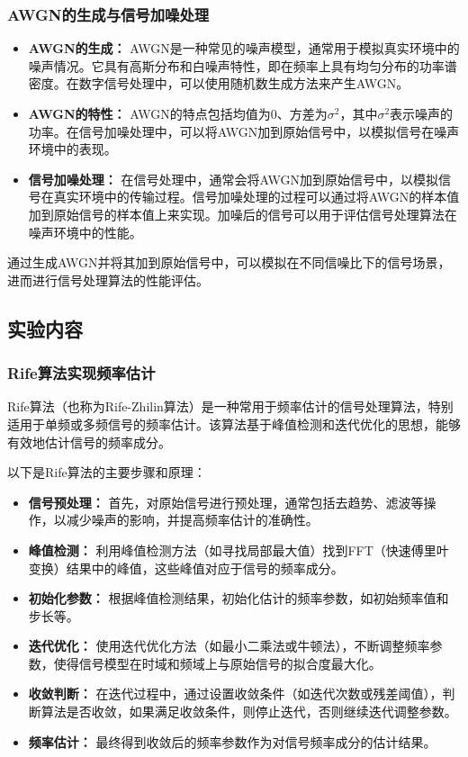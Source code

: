 \documentclass[a4paper,12pt]{article}
\begin{document}
\subsubsection{AWGN的生成与信号加噪处理}
\begin{itemize}
    \item \textbf{AWGN的生成：} AWGN是一种常见的噪声模型，通常用于模拟真实环境中的噪声情况。它具有高斯分布和白噪声特性，即在频率上具有均匀分布的功率谱密度。在数字信号处理中，可以使用随机数生成方法来产生AWGN。
    
    \item \textbf{AWGN的特性：} AWGN的特点包括均值为0、方差为$\sigma^2$，其中$\sigma^2$表示噪声的功率。在信号加噪处理中，可以将AWGN加到原始信号中，以模拟信号在噪声环境中的表现。
    
    \item \textbf{信号加噪处理：} 在信号处理中，通常会将AWGN加到原始信号中，以模拟信号在真实环境中的传输过程。信号加噪处理的过程可以通过将AWGN的样本值加到原始信号的样本值上来实现。加噪后的信号可以用于评估信号处理算法在噪声环境中的性能。
\end{itemize}

通过生成AWGN并将其加到原始信号中，可以模拟在不同信噪比下的信号场景，进而进行信号处理算法的性能评估。

\subsection{实验内容}
\subsubsection{Rife算法实现频率估计}
Rife算法（也称为Rife-Zhilin算法）是一种常用于频率估计的信号处理算法，特别适用于单频或多频信号的频率估计。该算法基于峰值检测和迭代优化的思想，能够有效地估计信号的频率成分。\cite{rife1989digital}

以下是Rife算法的主要步骤和原理：
\begin{itemize}
    \item \textbf{信号预处理：} 首先，对原始信号进行预处理，通常包括去趋势、滤波等操作，以减少噪声的影响，并提高频率估计的准确性。
    
    \item \textbf{峰值检测：} 利用峰值检测方法（如寻找局部最大值）找到FFT（快速傅里叶变换）结果中的峰值，这些峰值对应于信号的频率成分。
    
    \item \textbf{初始化参数：} 根据峰值检测结果，初始化估计的频率参数，如初始频率值和步长等。
    
    \item \textbf{迭代优化：} 使用迭代优化方法（如最小二乘法或牛顿法），不断调整频率参数，使得信号模型在时域和频域上与原始信号的拟合度最大化。
    
    \item \textbf{收敛判断：} 在迭代过程中，通过设置收敛条件（如迭代次数或残差阈值），判断算法是否收敛，如果满足收敛条件，则停止迭代，否则继续迭代调整参数。
    
    \item \textbf{频率估计：} 最终得到收敛后的频率参数作为对信号频率成分的估计结果。
\end{itemize}
\end{document}
